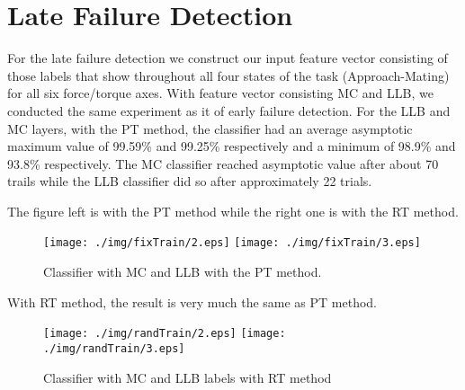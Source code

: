 \section{Late Failure Detection}
For the late failure detection we construct our input feature vector consisting of those labels that show throughout all four states of the task (Approach-Mating) for all six force/torque axes. With feature vector consisting MC and LLB, we conducted the same experiment as it of early failure detection. For the LLB and MC layers, with the PT method, the classifier had an average asymptotic maximum value of 99.59\% and 99.25\% respectively and a minimum of 98.9\% and 93.8\% respectively. The MC classifier reached asymptotic value after about 70 trails while the LLB classifier did so after approximately 22 trials. 

\indent The figure left is with the PT method while the right one is with the RT method.
\begin{figure}[h]
    \centering
    \texttt{[image: ./img/fixTrain/2.eps]}
    \texttt{[image: ./img/fixTrain/3.eps]}
    \caption{Classifier with MC and LLB with the PT method.}
    \label{fixMCLLB}
\end{figure}

\indent With RT method, the result is very much the same as PT method.
\begin{figure}[h]
    \centering
    \texttt{[image: ./img/randTrain/2.eps]}
    \texttt{[image: ./img/randTrain/3.eps]}
    \caption{Classifier with MC and LLB labels with RT method}
    \label{randMCLLB}
\end{figure}
